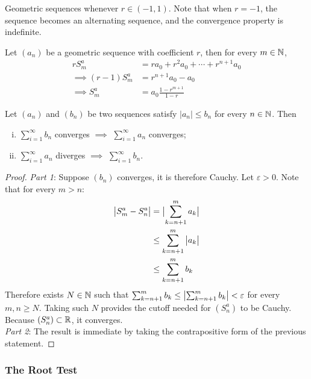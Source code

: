 \documentclass[11pt]{article}
\begin{document}
	\begin{proposition}
		Geometric sequences whenever $r \in (-1, 1)$. Note that when $r = -1$, the sequence becomes an alternating sequence, and the convergence property is indefinite.
	\end{proposition}
	
	\begin{proposition}
		Let $(a_n)$ be a geometric sequence with coefficient $r$, then for every $m \in \mathbb{N}$,
		\begin{align}
			r S^a_m &= ra_0 + r^2 a_0 + \cdots + r^{n+1} a_0 \\
			\implies (r - 1) S^a_m &= r^{n+1} a_0 - a_0 \\
			\implies S^a_m &= a_0 \frac{1 - r^{m+1}}{1 - r}
		\end{align}
	\end{proposition}
	
	\begin{theorem}
		Let $(a_n)$ and $(b_n)$ be two sequences satisfy $|a_n| \leq b_n$ for every $n \in \mathbb{N}$. Then
		\begin{enumerate}[(i)]
			\item $\sum_{i=1}^\infty b_n$ converges $\implies$ $\sum_{i=1}^\infty a_n$ converges;
			\item $\sum_{i=1}^\infty a_n$ diverges $\implies$ $\sum_{i=1}^\infty b_n$.
		\end{enumerate}
	\end{theorem}
	
	\begin{proof}
		\emph{Part 1}: Suppose $(b_n)$ converges, it is therefore Cauchy. Let $\varepsilon > 0$.
		Note that for every $m > n$:
		\begin{align}
			\big \vert {S^a_m - S^a_n} \big \vert &= \big \vert {\sum_{k=n+1}^m a_k} \big \vert \\
			&\leq \sum_{k=n+1}^m \big \vert {a_k} \big \vert \\
			&\leq \sum_{k=n+1}^m b_k
		\end{align}
		Therefore exists $N \in \mathbb{N}$ such that $\sum_{k=n+1}^m b_k \leq \big \vert {\sum_{k=n+1}^m b_k} \big \vert < \varepsilon$ for every $m, n \geq N$. Taking such $N$ provides the cutoff needed for $(S_n^a)$ to be Cauchy. Because $(S_n^a) \subset \mathbb{R}$, it converges. \\
		\emph{Part 2}: The result is immediate by taking the contrapositive form of the previous statement.
	\end{proof}
	
	\subsubsection{The Root Test}
	
\end{document}
